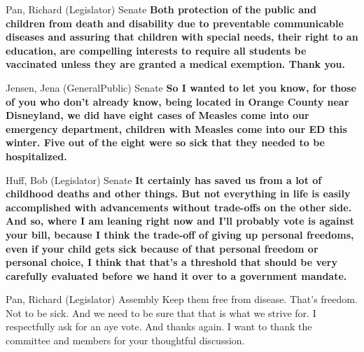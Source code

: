 \begin{result}{8.830523154233383}{Pan, Richard (Legislator) Senate}
\textbf{Both protection of the public and children from death and disability due to preventable communicable diseases and assuring that children with special needs, their right to an education, are compelling interests to require all students be vaccinated unless they are granted a medical exemption. Thank you.
}\end{result}

\begin{result}{8.67213374776659}{Jensen, Jena (GeneralPublic) Senate}
\textbf{So I wanted to let you know, for those of you who don't already know, being located in Orange County near Disneyland, we did have eight cases of Measles come into our emergency department, children with Measles come into our ED this winter. Five out of the eight were so sick that they needed to be hospitalized.
}\end{result}

\begin{result}{8.587621734089648}{Huff, Bob (Legislator) Senate}
\textbf{It certainly has saved us from a lot of childhood deaths and other things. But not everything in life is easily accomplished with advancements without trade-offs on the other side. And so, where I am leaning right now and I'll probably vote is against your bill, because I think the trade-off of giving up personal freedoms, even if your child gets sick because of that personal freedom or personal choice, I think that that's a threshold that should be very carefully evaluated before we hand it over to a government mandate.
}\end{result}

\begin{result}{8.02002802077853}{Pan, Richard (Legislator) Assembly}
Keep them free from disease. That's freedom. Not to be sick. And we need to be sure that that is what we strive for. I respectfully ask for an aye vote. And thanks again. I want to thank the committee and members for your thoughtful discussion.
\end{result}

